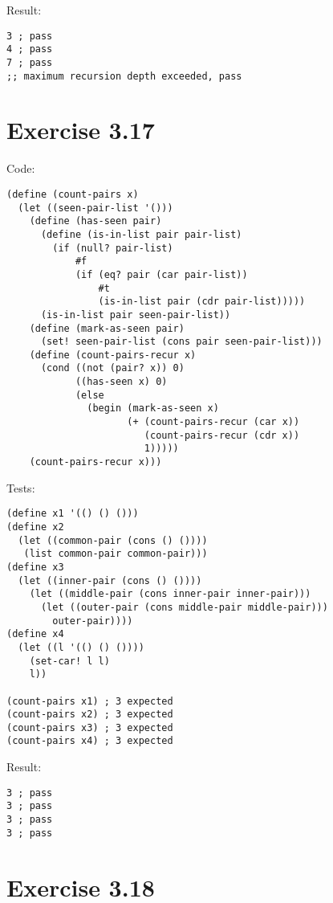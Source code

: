 \documentclass[../main.tex]{subfiles}
\begin{document}
Result:

\begin{lstlisting}
3 ; pass
4 ; pass
7 ; pass
;; maximum recursion depth exceeded, pass
\end{lstlisting}

\section{Exercise 3.17}

Code:

\begin{lstlisting}
(define (count-pairs x)
  (let ((seen-pair-list '()))
    (define (has-seen pair)
      (define (is-in-list pair pair-list)
        (if (null? pair-list)
            #f
            (if (eq? pair (car pair-list))
                #t
                (is-in-list pair (cdr pair-list)))))
      (is-in-list pair seen-pair-list))
    (define (mark-as-seen pair)
      (set! seen-pair-list (cons pair seen-pair-list)))
    (define (count-pairs-recur x)
      (cond ((not (pair? x)) 0)
            ((has-seen x) 0)
            (else
              (begin (mark-as-seen x)
                     (+ (count-pairs-recur (car x))
                        (count-pairs-recur (cdr x))
                        1)))))
    (count-pairs-recur x)))
\end{lstlisting}

Tests:

\begin{lstlisting}
(define x1 '(() () ()))
(define x2
  (let ((common-pair (cons () ())))
   (list common-pair common-pair)))
(define x3
  (let ((inner-pair (cons () ())))
    (let ((middle-pair (cons inner-pair inner-pair)))
      (let ((outer-pair (cons middle-pair middle-pair)))
        outer-pair))))
(define x4
  (let ((l '(() () ())))
    (set-car! l l)
    l))

(count-pairs x1) ; 3 expected
(count-pairs x2) ; 3 expected
(count-pairs x3) ; 3 expected
(count-pairs x4) ; 3 expected
\end{lstlisting}

Result:

\begin{lstlisting}
3 ; pass
3 ; pass
3 ; pass
3 ; pass
\end{lstlisting}

\section{Exercise 3.18}
\end{document}
